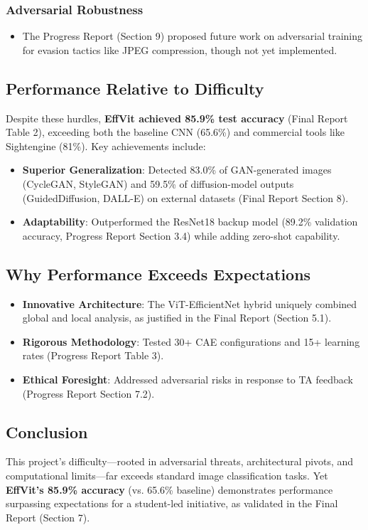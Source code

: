 \documentclass{article} %
\begin{document}
\subsubsection{Adversarial Robustness}  
\begin{itemize}
    \item The Progress Report (Section 9) proposed future work on adversarial training for evasion tactics like JPEG compression, though not yet implemented.  
\end{itemize}

\subsection{Performance Relative to Difficulty}  
Despite these hurdles, \textbf{EffVit achieved 85.9\% test accuracy} (Final Report Table 2), exceeding both the baseline CNN (65.6\%) and commercial tools like Sightengine (81\%). Key achievements include:  

\begin{itemize}
    \item \textbf{Superior Generalization}: Detected 83.0\% of GAN-generated images (CycleGAN, StyleGAN) and 59.5\% of diffusion-model outputs (GuidedDiffusion, DALL-E) on external datasets (Final Report Section 8).  
    \item \textbf{Adaptability}: Outperformed the ResNet18 backup model (89.2\% validation accuracy, Progress Report Section 3.4) while adding zero-shot capability.  
\end{itemize}

\subsection{Why Performance Exceeds Expectations}  
\begin{itemize}
    \item \textbf{Innovative Architecture}: The ViT-EfficientNet hybrid uniquely combined global and local analysis, as justified in the Final Report (Section 5.1).  
    \item \textbf{Rigorous Methodology}: Tested 30+ CAE configurations and 15+ learning rates (Progress Report Table 3).  
    \item \textbf{Ethical Foresight}: Addressed adversarial risks in response to TA feedback (Progress Report Section 7.2).  
\end{itemize}

\subsection{Conclusion}  
This project’s difficulty—rooted in adversarial threats, architectural pivots, and computational limits—far exceeds standard image classification tasks. Yet \textbf{EffVit’s 85.9\% accuracy} (vs. 65.6\% baseline) demonstrates performance surpassing expectations for a student-led initiative, as validated in the Final Report (Section 7).  

\label{last_page}



\end{document}
